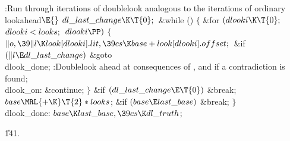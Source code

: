 \Y\B\4:Run through iterations of doublelook analogous to the iterations of
ordinary lookahead\X${}\E{}$\6
$\\{dl\_last\_change}\K\T{0};{}$\6
\&{while} ()\5
${}\{{}$\1\6
\&{for} ${}(\\{dlooki}\K\T{0};{}$ ${}\\{dlooki}<\\{looks};{}$ ${}\\{dlooki}%
\PP){}$\5
${}\{{}$\1\6
${}\|o,\39\|l\K\\{look}[\\{dlooki}].\\{lit},\39\\{cs}\K\\{base}+\\{look}[%
\\{dlooki}].\\{offset};{}$\6
\&{if} ${}(\|l\E\\{dl\_last\_change}){}$\1\5
\&{goto} \\{dlook\_done};\2\6
:Doublelook ahead at consequences of , and  if a contradiction is found\X;\6
\4\\{dlook\_on}:\5
\&{continue};\6
\4${}\}{}$\2\6
\&{if} ${}(\\{dl\_last\_change}\E\T{0}){}$\1\5
\&{break};\2\6
${}\\{base}\MRL{+{\K}}\T{2}*\\{looks}{}$;\6
\&{if} ${}(\\{base}\E\\{last\_base}){}$\1\5
\&{break};\2\6
\4${}\}{}$\2\6
\4\\{dlook\_done}:\5
${}\\{base}\K\\{last\_base},\39\\{cs}\K\\{dl\_truth}{}$;\par
\U141.\fi

